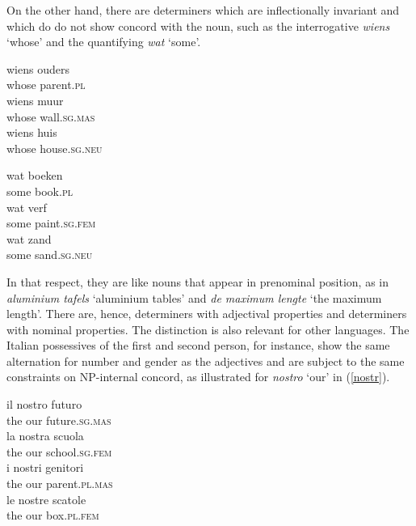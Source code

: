 \documentclass[output=paper
	        ,collection
	        ,collectionchapter
 	        ,biblatex
                ,babelshorthands
                ,newtxmath
                ,draftmode
                ,colorlinks, citecolor=brown
]{langscibook}
\begin{document}
\noindent
On the other hand, there are determiners which are inflectionally invariant and which do 
do not show concord with the noun, such as the interrogative \emph{wiens} `whose' 
and the quantifying \emph{wat} `some'. 

\begin{exe} 
\ex\label{wiens}
\begin{xlist} 
\ex
\gll  wiens ouders \\ 
      whose parent.\textsc{pl} \\
\ex
\gll  wiens muur \\ 
      whose wall.\textsc{sg.mas} \\
\ex
\gll  wiens huis \\ 
      whose house.\textsc{sg.neu} \\
\end{xlist}
\ex\label{wat}
\begin{xlist}
\ex
\gll  wat boeken  \\
      some book.\textsc{pl} \\
\ex
\gll  wat verf                  \\
      some paint.\textsc{sg.fem} \\
\ex
\gll  wat zand  \\
      some sand.\textsc{sg.neu} \\
\end{xlist} 
\end{exe} 

\noindent
In that respect, they are like nouns that appear in prenominal position,
as in \emph{aluminium tafels} `aluminium tables' and \emph{de maximum lengte}
`the maximum length'. There are, hence, determiners with adjectival 
properties and determiners with nominal properties.   
The distinction is also relevant for other languages. The Italian 
possessives of the first and second person, for instance, 
show the same alternation for number and gender as the adjectives
and are subject to the same constraints on NP-internal concord, as illustrated 
for \emph{nostro} `our' in (\ref{nostr}). 

\begin{exe}  
\ex\label{nostr} 
\begin{xlist}
\ex 
\gll  il nostro futuro \\
      the our future.\textsc{sg.mas} \\ 
\ex 
\gll  la nostra scuola  \\
      the our school.\textsc{sg.fem} \\ 
\ex 
\gll  i nostri genitori \\
      the our parent.\textsc{pl.mas} \\ 
\ex 
\gll  le nostre scatole \\
      the our box.\textsc{pl.fem} \\ 
\end{xlist}
\end{exe} 
\end{document}

